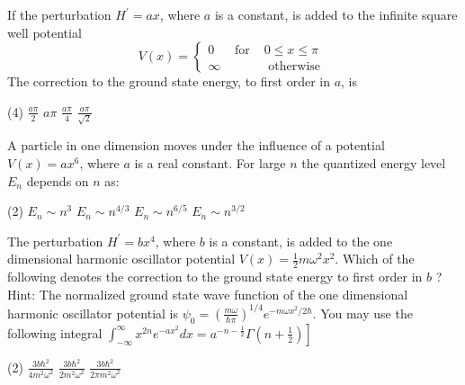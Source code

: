  \begin{enumerate}
 \begin{minipage}{\textwidth}
 	\item If the perturbation $H^{\prime}=a x$, where $a$ is a constant, is added to the infinite square well potential
 	$$
 	V(x)=\left\{\begin{array}{lll}
 	0 & \text { for } & 0 \leq x \leq \pi \\
 	\infty & & \text { otherwise }
 	\end{array}\right.
 	$$
 	The correction to the ground state energy, to first order in $a$, is
 \end{minipage}
 \begin{tasks}(4)
 	\task[\textbf{A.}] $\frac{a \pi}{2}$
 	\task[\textbf{B.}]$a \pi$
 	\task[\textbf{C.}]$\frac{a \pi}{4}$
 	\task[\textbf{D.}]$\frac{a \pi}{\sqrt{2}}$
 \end{tasks}
\begin{minipage}{\textwidth}
	\item A particle in one dimension moves under the influence of a potential $V(x)=a x^{6}$, where $a$ is a real constant. For large $n$ the quantized energy level $E_{n}$ depends on $n$ as:
\end{minipage}
\begin{tasks}(2)
	\task[\textbf{A.}] $E_{n} \sim n^{3}$
	\task[\textbf{B.}]$E_{n} \sim n^{4 / 3}$
	\task[\textbf{C.}]$E_{n} \sim n^{6 / 5}$
	\task[\textbf{D.}]$E_{n} \sim n^{3 / 2}$
\end{tasks}
\begin{minipage}{\textwidth}
	\item The perturbation $H^{\prime}=b x^{4}$, where $b$ is a constant, is added to the one dimensional harmonic oscillator potential $V(x)=\frac{1}{2} m \omega^{2} x^{2}$. Which of the following denotes the correction to the ground state energy to first order in $b$ ?
	Hint: The normalized ground state wave function of the one dimensional harmonic oscillator potential is $\psi_{0}=\left(\frac{m \omega}{\hbar \pi}\right)^{1 / 4} e^{-m \omega x^{2} / 2 \hbar} .$ You may use the following integral $\left.\int_{-\infty}^{\infty} x^{2 n} e^{-a x^{2}} d x=a^{-n-\frac{1}{2}} \Gamma\left(n+\frac{1}{2}\right)\right]$
\end{minipage}
\begin{tasks}(2)
	\task[\textbf{A.}] $\frac{3 b \hbar^{2}}{4 m^{2} \omega^{2}}$
	\task[\textbf{B.}]$\frac{3 b \hbar^{2}}{2 m^{2} \omega^{2}}$
	\task[\textbf{C.}]$\frac{3 b \hbar^{2}}{2 \pi m^{2} \omega^{2}}$

\end{tasks}
\end{enumerate}
